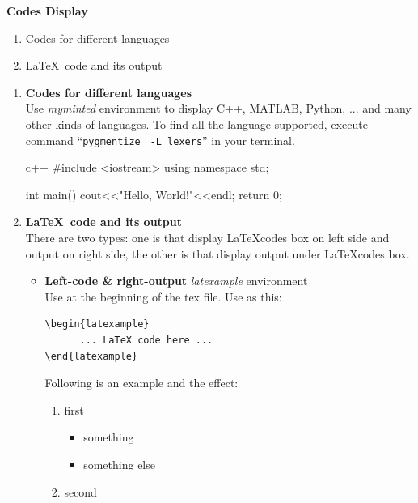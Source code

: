 \begin{problem}[3]
    \textbf{Codes Display}
    \begin{enumerate}[nosep,label=(\arabic*)]
    \item Codes for different languages
    \item \LaTeX \ code and its output
    \end{enumerate}
\end{problem}

\begin{solution}
    \begin{enumerate}[nosep,label=(\arabic*)]
    \item \textbf{Codes for different languages} \\
        Use \textit{myminted} environment to display C++, MATLAB, Python, ... and many other kinds of languages. To find all the language supported, execute command ``\verb|pygmentize| \verb| -L lexers|'' in your terminal.\\
\begin{latexample}[]
\begin{myminted}{c++}
#include <iostream>
using namespace std;

int main()
{
  cout<<"Hello, World!"<<endl;
  return 0;
}
\end{myminted}
\end{latexample}

    \item \textbf{\LaTeX \ code and its output} \\
        There are two types: one is that display \LaTeX codes box on left side and output on right side, the other is that display output under \LaTeX codes box.
        \begin{itemize}
            \item \textbf{Left-code \& right-output} \cndash \textit{latexample} environment \\
                Use \verb++ at the beginning of the tex file. Use as this:
\begin{verbatim}
\begin{latexample}
      ... LaTeX code here ...
\end{latexample}
\end{verbatim}
                Following is an example\label{enum} and the effect: \\
\begin{latexample}[]
\begin{enumerate}[nosep,label=(\arabic*)]
  \item first
    \begin{itemize}
      \item something
      \item something else
    \end{itemize}
  \item second
\end{enumerate}
\end{latexample}


\end{itemize}
\end{enumerate}
\end{solution}
